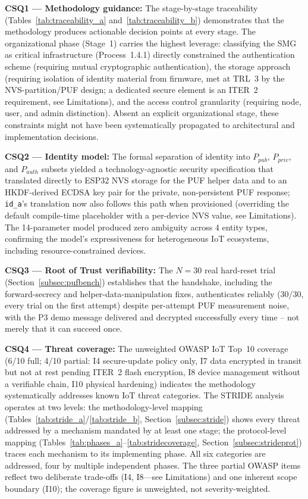 \documentclass[preprint,12pt,authoryear]{elsarticle}
\begin{document}
\textbf{CSQ1 --- Methodology guidance:} The stage-by-stage traceability (Tables~\ref{tab:traceability_a} and~\ref{tab:traceability_b}) demonstrates that the methodology produces actionable decision points at every stage. The organizational phase (Stage~1) carries the highest leverage: classifying the SMG as critical infrastructure (Process~1.4.1) directly constrained the authentication scheme (requiring mutual cryptographic authentication), the storage approach (requiring isolation of identity material from firmware, met at TRL~3 by the NVS-partition/PUF design; a dedicated secure element is an ITER~2 requirement, see Limitations), and the access control granularity (requiring node, user, and admin distinction). Absent an explicit organizational stage, these constraints might not have been systematically propagated to architectural and implementation decisions.

\textbf{CSQ2 --- Identity model:} The formal separation of identity into $P_{pub}$, $P_{priv}$, and $P_{auth}$ subsets yielded a technology-agnostic security specification that translated directly to ESP32 NVS storage for the PUF helper data and to an HKDF-derived ECDSA key pair for the private, non-persistent PUF response; \texttt{id\_a}'s translation now also follows this path when provisioned (overriding the default compile-time placeholder with a per-device NVS value, see Limitations). The 14-parameter model produced zero ambiguity across 4 entity types, confirming the model's expressiveness for heterogeneous IoT ecosystems, including resource-constrained devices.

\textbf{CSQ3 --- Root of Trust verifiability:} The $N=30$ real hard-reset trial (Section~\ref{subsec:pufbench}) establishes that the handshake, including the forward-secrecy and helper-data-manipulation fixes, authenticates reliably (30/30, every trial on the first attempt) despite per-attempt PUF measurement noise, with the P3 demo message delivered and decrypted successfully every time -- not merely that it can succeed once.

\textbf{CSQ4 --- Threat coverage:} The unweighted OWASP IoT Top~10 coverage (6/10 full; 4/10 partial: I4 secure-update policy only, I7 data encrypted in transit but not at rest pending ITER~2 flash encryption, I8 device management without a verifiable chain, I10 physical hardening) indicates the methodology systematically addresses known IoT threat categories. The STRIDE analysis operates at two levels: the methodology-level mapping (Tables~\ref{tab:stride_a}/\ref{tab:stride_b}, Section~\ref{subsec:stride}) shows every threat addressed by a mechanism mandated by at least one stage; the protocol-level mapping (Tables~\ref{tab:phases_a}--\ref{tab:stridecoverage}, Section~\ref{subsec:strideprot}) traces each mechanism to its implementing phase. All six categories are addressed, four by multiple independent phases. The three partial OWASP items reflect two deliberate trade-offs (I4, I8---see Limitations) and one inherent scope boundary (I10); the coverage figure is unweighted, not severity-weighted.
\end{document}

